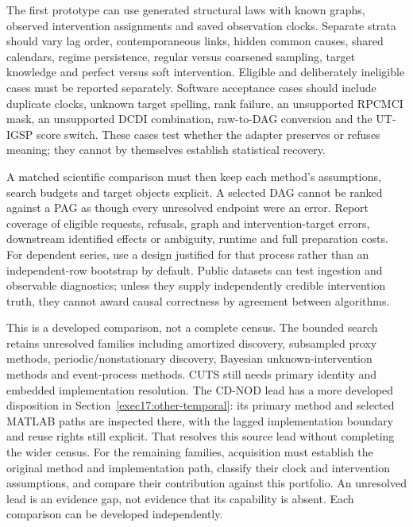 The first prototype can use generated structural laws with known graphs,
observed intervention assignments and saved observation clocks. Separate
strata should vary lag order, contemporaneous links, hidden common causes,
shared calendars, regime persistence, regular versus coarsened sampling,
target knowledge and perfect versus soft intervention. Eligible and
deliberately ineligible cases must be reported separately. Software
acceptance cases should include duplicate clocks, unknown target spelling,
rank failure, an unsupported RPCMCI mask, an unsupported DCDI combination,
raw-to-DAG conversion and the UT-IGSP score switch. These cases test whether
the adapter preserves or refuses meaning; they cannot by themselves establish
statistical recovery. \citep{exec14_pt_contract,exec14_pt_exact}

A matched scientific comparison must then keep each method's assumptions,
search budgets and target objects explicit. A selected DAG cannot be ranked
against a PAG as though every unresolved endpoint were an error. Report
coverage of eligible requests, refusals, graph and intervention-target errors,
downstream identified effects or ambiguity, runtime and full preparation
costs. For dependent series, use a design justified for that process rather
than an independent-row bootstrap by default. Public datasets can test
ingestion and observable diagnostics; unless they supply independently
credible intervention truth, they cannot award causal correctness by
agreement between algorithms. \citep{exec14_pt_contract}

This is a developed comparison, not a complete census. The bounded search
retains unresolved families including amortized discovery, subsampled
proxy methods, periodic/nonstationary discovery, Bayesian unknown-intervention
methods and event-process methods. CUTS still needs primary identity and
embedded implementation resolution. The CD-NOD lead has a more developed
disposition in Section~\ref{exec17:other-temporal}: its primary method and
selected MATLAB paths are inspected there, with the lagged implementation
boundary and reuse rights still explicit. That resolves this source lead
without completing the wider census. For the remaining families, acquisition
must establish the original method and implementation path, classify their
clock and intervention assumptions, and compare their contribution against
this portfolio. An unresolved lead is an evidence gap, not evidence that its
capability is absent. Each comparison can be developed independently.
\citep{exec14_pt_contract}
\label{exec14:python-temporal-end}
